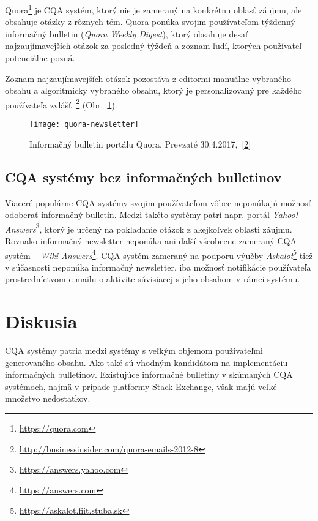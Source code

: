 Quora\footnote{\url{https://quora.com}} je CQA systém, ktorý nie je zameraný na konkrétnu oblasť záujmu, ale obsahuje
otázky z rôznych tém. Quora ponúka svojim používateľom týždenný informačný bulletin (\emph{Quora Weekly Digest}),
ktorý obsahuje desať najzaujímavejšich otázok za posledný týždeň a zoznam ľudí, ktorých používateľ potenciálne pozná.

Zoznam najzaujímavejších otázok pozostáva z editormi manuálne vybraného obsahu a algoritmicky vybraného obsahu,
ktorý je personalizovaný pre každého používateľa zvlášť~\footnote{\url{http://businessinsider.com/quora-emails-2012-8}\label{fnote-bi}} (Obr.~\ref{fig:quora-newsletter}).

\begin{figure}[H]\begin{center}
\texttt{[image: quora-newsletter]}
\caption{Informačný bulletin portálu Quora. Prevzaté 30.4.2017,~[\ref{fnote-bi}] \label{fig:quora-newsletter}}\end{center}
\end{figure}

\subsection{CQA systémy bez informačných bulletinov}

Viaceré populárne CQA systémy svojim používateľom vôbec neponúkajú možnosť odoberať informačný bulletin. Medzi takéto
systémy patrí napr. portál \emph{Yahoo! Answers}\footnote{\url{https://answers.yahoo.com}}, ktorý je určený na pokladanie
otázok z akejkoľvek oblasti záujmu. Rovnako informačný newsletter neponúka ani ďalší všeobecne zameraný CQA systém --
\emph{Wiki Answers}\footnote{\url{https://answers.com}}. CQA systém zameraný na podporu výučby
\emph{Askalot}\footnote{\url{https://askalot.fiit.stuba.sk}} tiež v súčasnosti neponúka informačný newsletter,
iba možnosť notifikácie používateľa prostredníctvom e-mailu o aktivite súvisiacej s jeho obsahom v rámci systému.


\section{Diskusia}

CQA systémy patria medzi systémy s veľkým objemom používateľmi generovaného obsahu. Ako také sú vhodným kandidátom na
implementáciu informačných bulletinov. Existujúce informačné bulletiny v skúmaných CQA systémoch, najmä v prípade
platformy Stack Exchange, však majú veľké množstvo nedostatkov.

